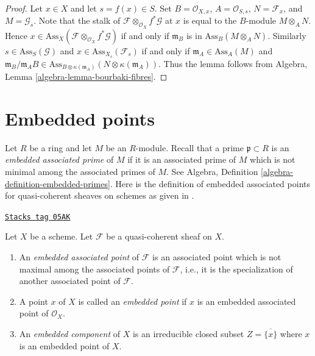 \begin{proof}
Let $x \in X$ and let $s = f(x) \in S$.
Set $B = \mathcal{O}_{X, x}$, $A = \mathcal{O}_{S, s}$,
$N = \mathcal{F}_x$, and $M = \mathcal{G}_s$.
Note that the stalk of $\mathcal{F} \otimes_{\mathcal{O}_X} f^*\mathcal{G}$
at $x$ is equal to the $B$-module $M \otimes_A N$. Hence
$x \in \text{Ass}_X(\mathcal{F} \otimes_{\mathcal{O}_X} f^*\mathcal{G})$
if and only if $\mathfrak m_B$ is in $\text{Ass}_B(M \otimes_A N)$.
Similarly $s \in \text{Ass}_S(\mathcal{G})$ and
$x \in \text{Ass}_{X_s}(\mathcal{F}_s)$ if and only if
$\mathfrak m_A \in \text{Ass}_A(M)$ and
$\mathfrak m_B/\mathfrak m_A B \in
\text{Ass}_{B \otimes \kappa(\mathfrak m_A)}(N \otimes \kappa(\mathfrak m_A))$.
Thus the lemma follows from
Algebra, Lemma \ref{algebra-lemma-bourbaki-fibres}.
\end{proof}

\section{Embedded points}
\label{divisors-section-embedded}
Let $R$ be a ring and let $M$ be an $R$-module.
Recall that a prime $\mathfrak p \subset R$ is an
{\it embedded associated prime} of $M$ if it is an associated prime of
$M$ which is not minimal among the associated primes of $M$. See
Algebra, Definition \ref{algebra-definition-embedded-primes}.
Here is the definition of embedded associated points
for quasi-coherent sheaves on schemes
as given in \cite[IV Definition 3.1.1]{EGA}.

\begin{definition}[Embedded]
\label{divisors-definition-embedded}
\href{https://stacks.math.columbia.edu/tag/05AK}{\texttt{Stacks tag 05AK}}

Let $X$ be a scheme.
Let $\mathcal{F}$ be a quasi-coherent sheaf on $X$.
\begin{enumerate}
\item An {\it embedded associated point} of $\mathcal{F}$
is an associated point which is not maximal among the
associated points of $\mathcal{F}$, i.e., it is the specialization
of another associated point of $\mathcal{F}$.
\item A point $x$ of $X$ is called an {\it embedded point}
if $x$ is an embedded associated point of $\mathcal{O}_X$.
\item An {\it embedded component} of $X$ is an irreducible
closed subset $Z = \overline{\{x\}}$ where $x$ is an embedded
point of $X$.
\end{enumerate}
\end{definition}

